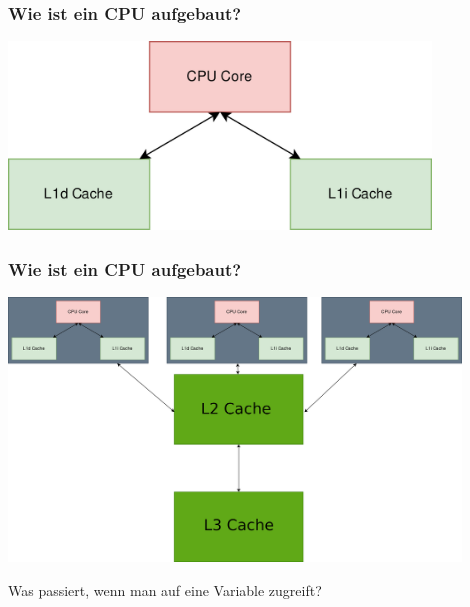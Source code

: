 \documentclass{beamer}
\begin{document}
%
\begin{frame}[t]
\frametitle{Wie ist ein CPU aufgebaut?}
\centering
\includegraphics[height=5cm]{cpu3.png}
\end{frame}

\begin{frame}[t]
\frametitle{Wie ist ein CPU aufgebaut?}
\centering
\centerline{\includegraphics[width=12cm]{cpu6.png}}
\end{frame}

\begin{frame}
\centering
\Huge
    Was passiert, wenn man auf eine Variable zugreift?
\end{frame}
\end{document}
